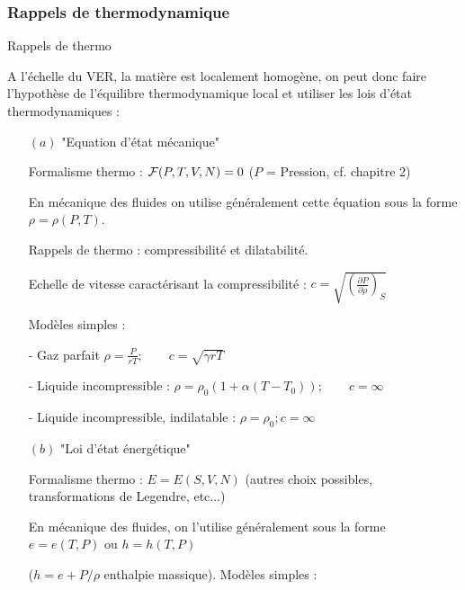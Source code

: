 \subsubsection{Rappels de thermodynamique}

\begin{frame}{Rappels de thermo}

\small 


 A l'échelle du VER, la matière est localement homogène, on peut donc faire l'hypothèse de l'équilibre thermodynamique local 
 et utiliser les lois d'état thermodynamiques :
  
  \pause
\medskip
 
\begin{itemize}
\item[$(a)$]  "Equation d'état mécanique"   

Formalisme thermo : ${\cal F}( P,T,V,N) = 0$ ($P$ = Pression, cf. chapitre 2) 

En mécanique des fluides on utilise généralement cette équation sous la forme $\rho = \rho(P,T)$.

Rappels de thermo : compressibilité et dilatabilité.

Echelle de vitesse caractérisant la compressibilité : $c = \sqrt{ \left( \frac{\partial P}{\partial \rho} \right)_S }$

Modèles simples :

 - Gaz parfait $\rho = \frac{P}{r T} ; \qquad c = \sqrt{\gamma r T}$
 
- Liquide incompressible : $\rho = \rho_0 (1+\alpha (T-T_0)) ; \qquad c = \infty$

- Liquide incompressible, indilatable :  $\rho = \rho_0 ; c = \infty $

 
	

\pause
\medskip

\item[$(b)$] "Loi d'état énergétique" 

Formalisme thermo : $E = E(S,V,N)$ (autres choix possibles, transformations de Legendre, etc...)

En mécanique des fluides, on l'utilise généralement sous la forme $e = e(T,P)$ ou $h = h(T,P)$ 

($h = e + P/\rho$ enthalpie massique).
Modèles simples :


\end{itemize}
\end{frame}
